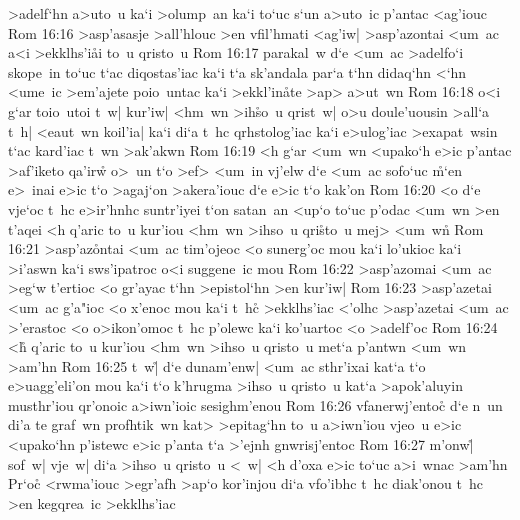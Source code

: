 >adelf`hn
a>uto~u
ka`i
>olump~an
ka`i
to`uc
s`un
a>uto~ic
p'antac
<ag'iouc\bibvsend
\vs Rom 16:16
>asp'asasje
>all'hlouc
>en
vfil'hmati
<ag'iw|
>asp'azontai
<um~ac
a<i
>ekklhs'i\r{a}i
to~u
qristo~u\bibvsend
\vs Rom 16:17
parakal~w
d`e
<um~ac
>adelfo`i
skope~in
to`uc
t`ac
diqostas'iac
ka`i
t`a
sk'andala
par`a
t`hn
didaq`hn
<`hn
<ume~ic
>em'ajete
poio~untac
ka`i
>ekkl'in\r{a}te
>ap>
a>ut~wn\bibvsend
\vs Rom 16:18
o<i
g`ar
toio~utoi
t~w|
kur'iw|
<hm~wn
>ih\r{s}o~u
qrist~w|
o>u
doule'uousin
>all`a
t~h|
<eaut~wn
koil'ia|
ka`i
di`a
t~hc
qrhstolog'iac
ka`i
e>ulog'iac
>exapat~wsin
t`ac
kard'iac
t~wn
>ak'akwn\bibvsend
\vs Rom 16:19
<h
g`ar
<um~wn
<upako`h
e>ic
p'antac
>af'iketo
qa'irw\r{}
o>~un
t`o
>ef>
<um~in
vj'elw
d`e
<um~ac
sofo`uc
\r{m}`en
e>~inai
e>ic
t`o
>agaj`on
>akera'iouc
d`e
e>ic
t`o
kak'on\bibvsend
\vs Rom 16:20
<o
d`e
vje`oc
t~hc
e>ir'hnhc
suntr'iyei
t`on
satan~an
<up`o
to`uc
p'odac
<um~wn
>en
t'aqei
<h
q'aric
to~u
kur'iou
<hm~wn
>ihso~u
qri\r{s}to~u
mej>
<um~w\r{n}\bibvsend
{}
\vs Rom 16:21
>asp'az\r{o}ntai
<um~ac
tim'ojeoc
<o
sunerg'oc
mou
ka`i
lo'ukioc
ka`i
>i'aswn
ka`i
sws'ipatroc
o<i
suggene~ic
mou\bibvsend
\vs Rom 16:22
>asp'azomai
<um~ac
>eg`w
t'ertioc
<o
gr'ayac
t`hn
>epistol`hn
>en
kur'iw|\bibvsend
\vs Rom 16:23
>asp'azetai
<um~ac
g'a"ioc
<o
x'enoc
mou
ka`i
t~hc\r{}
>ekklhs'iac
<'olhc
>asp'azetai
<um~ac
>'erastoc
<o
o>ikon'omoc
t~hc
p'olewc
ka`i
ko'uartoc
<o
>adelf'oc\bibvsend
\vs Rom 16:24
<h\r{}
q'aric
to~u
kur'iou
<hm~wn
>ihso~u
qristo~u
met`a
p'antwn
<um~wn
>am'hn\bibvsend
\vs Rom 16:25
t~w|\r{}
d`e
dunam'enw|
<um~ac
sthr'ixai
kat`a
t`o
e>uagg'eli'on
mou
ka`i
t`o
k'hrugma
>ihso~u
qristo~u
kat`a
>apok'aluyin
musthr'iou
qr'onoic
a>iwn'ioic
sesighm'enou\bibvsend
\vs Rom 16:26
vfanerwj'entoc\r{}
d`e
n~un
di'a
te
graf~wn
profhtik~wn
kat>
>epitag`hn
to~u
a>iwn'iou
vjeo~u
e>ic
<upako`hn
p'istewc
e>ic
p'anta
t`a
>'ejnh
gnwrisj'entoc\bibvsend
\vs Rom 16:27
m'onw|\r{}
sof~w|
vje~w|
di`a
>ihso~u
qristo~u
<~w|
<h
d'oxa
e>ic
to`uc
a>i~wnac
>am'hn\bibvsend
Pr`oc\r{}
<rwma'iouc
>egr'afh
>ap`o
kor'injou
di`a
vfo'ibhc
t~hc
diak'onou
t~hc
>en
kegqrea~ic
>ekklhs'iac\bibvsend
